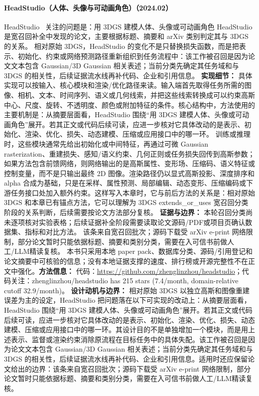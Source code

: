 \paragraph{HeadStudio（人体、头像与可动画角色）（2024.02）}
HeadStudio~\cite{2402_06149} 关注的问题是：用 3DGS 建模人体、头像或可动画角色 HeadStudio 是宽召回补全中发现的论文，主要根据标题、摘要和 arXiv 类别判定其与 3DGS 的关系。
相对原始 3DGS，HeadStudio 的变化不是只替换损失函数，而是把表示、初始化、约束或网络预测路径重新组织到任务流程中：该工作被召回是因为论文文本包含 Gaussian/3D Gaussian 相关表述；当前分类先确定其任务域和与 3DGS 的相关性，后续证据流水线再补代码、企业和引用信息。
\textbf{实现细节：} 具体实现可以按输入、核心模块和渲染/优化路径来读。输入端首先取得任务所需的图像、相机、文本、时间序列、语义或几何线索，并把这些线索转换成可以约束高斯中心、尺度、旋转、不透明度、颜色或附加特征的条件。核心结构中，方法使用的主要机制是：从摘要层面看，HeadStudio 围绕“用 3DGS 建模人体、头像或可动画角色”展开。若其正文或代码后续可读，应进一步核对它具体改动的是表示、初始化、渲染、优化、损失、动态建模、压缩或应用接口中的哪一环。 训练或推理时，这些模块通常先给出初始化或中间特征，再通过可微 Gaussian rasterization、重建损失、感知/语义约束、几何正则或任务损失回传到高斯参数；如果方法包含前馈网络，则网络输出的是高斯属性、变形场、压缩码、语义特征或控制变量，而不是只输出最终 2D 图像。渲染路径仍以显式高斯投影、深度排序和 alpha 合成为基础，只是在采样、属性预测、局部编辑、动态变形、压缩编码或下游任务接口处加入额外约束。这样写入本章时，它与前后方法的关系是：相对原始 3DGS 和本章已有锚点方法，它可以理解为 3DGS extends\_or\_uses 宽召回分类阶段的关系判断，后续需要按论文方法部分复核。
\textbf{证据与边界：} 本轮召回分类尚未逐项核对实验表格；后续证据补全阶段需要读取论文源码/PDF或项目页确认数据集、指标和对比方法。 该条来自宽召回批次；源码下载受 arXiv e-print 网络限制，部分论文暂时只能依据标题、摘要和类别分类，需要在入可信书前做人工/LLM精读复核。 本书只采用本地 paper pack、数据库分类、源码/引用登记和论文摘要中可核验的信息；没有本地证据支撑的速度、排行榜或开源完整性不在正文中强化。\textbf{方法信息：} 代码：\url{https://github.com/zhenglinzhou/headstudio}；代码关注：zhenglinzhou/headstudio has 215 stars (7.4/month, domain-relative cutoff 32.9/month)。
\textbf{设计动机与边界：} 相对原始 3DGS 以独立高斯和图像重建误差为主的设定，HeadStudio 把问题落在以下可实现的改动上：从摘要层面看，HeadStudio 围绕“用 3DGS 建模人体、头像或可动画角色”展开。若其正文或代码后续可读，应进一步核对它具体改动的是表示、初始化、渲染、优化、损失、动态建模、压缩或应用接口中的哪一环。其设计目的不是单独增加一个模块，而是用上述表示、监督或渲染约束消除原流程在目标任务中的具体失配。该工作被召回是因为论文文本包含 Gaussian/3D Gaussian 相关表述；当前分类先确定其任务域和与 3DGS 的相关性，后续证据流水线再补代码、企业和引用信息。适用时还应保留论文给出的边界：该条来自宽召回批次；源码下载受 arXiv e-print 网络限制，部分论文暂时只能依据标题、摘要和类别分类，需要在入可信书前做人工/LLM精读复核。
